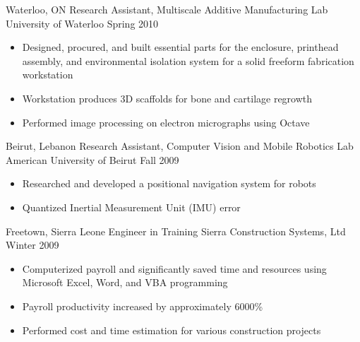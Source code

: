 \documentclass[10pt, letterpaper]{moderncv}
\begin{document}
    \begin{samepage}
      \cventry
          {Waterloo, ON}
          {Research Assistant, %
	      Multiscale Additive Manufacturing Lab
}
          {%
University of Waterloo%
}
          {Spring 2010}
        {}
        {
            \begin{itemize}
                \item{Designed, procured, and built essential parts for the enclosure, printhead assembly, and environmental isolation system for a solid freeform fabrication workstation}
                \item{Workstation produces 3D scaffolds for bone and cartilage regrowth}
                \item{Performed image processing on electron micrographs using Octave}
            \end{itemize}
        }
    \end{samepage}
    \begin{samepage}
      \cventry
          {Beirut, Lebanon}
          {Research Assistant, %
	      Computer Vision and Mobile Robotics Lab
}
          {%
American University of Beirut%
}
          {Fall 2009}
        {}
        {
            \begin{itemize}
                \item{Researched and developed a positional navigation system for robots}
                \item{Quantized Inertial Measurement Unit (IMU) error}
            \end{itemize}
        }
    \end{samepage}
    \begin{samepage}
      \cventry
          {Freetown, Sierra Leone}
          {Engineer in Training%
}
          {%
Sierra Construction Systems, Ltd%
}
          {Winter 2009}
        {}
        {
            \begin{itemize}
                \item{Computerized payroll and significantly saved time and resources using Microsoft Excel, Word, and VBA programming}
                \item{Payroll productivity increased by approximately 6000\%}
                \item{Performed cost and time estimation for various construction projects}
            \end{itemize}
        }
    \end{samepage}
\end{document}
